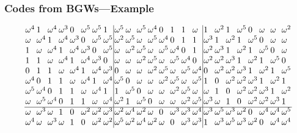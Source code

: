 \documentclass{beamer}
\begin{document}
 \begin{frame}
  \frametitle{Codes from BGWs---Example}
  \begin{scriptsize}
  \[
  \arraycolsep=1.0pt\def\arraystretch{1.0}
   \begin{array}{llllllll|llllllll|llllllll}
\omega^4 & 1 & \omega^4 & \omega^3 & 0 & \omega^5 & \omega^5 & 1 & \omega^5 & \omega & \omega^5 & \omega^4 & 0 & 1 & 1 & \omega & 1 & \omega^2 & 1 & \omega^5 & 0 & \omega & \omega & \omega^2 \\
\omega & \omega^4 & 1 & \omega^4 & \omega^3 & 0 & \omega^5 & \omega^5 & \omega^2 & \omega^5 & \omega & \omega^5 & \omega^4 & 0 & 1 & 1 & \omega^3 & 1 & \omega^2 & 1 & \omega^5 & 0 & \omega & \omega \\
1 & \omega & \omega^4 & 1 & \omega^4 & \omega^3 & 0 & \omega^5 & \omega & \omega^2 & \omega^5 & \omega & \omega^5 & \omega^4 & 0 & 1 & \omega^2 & \omega^3 & 1 & \omega^2 & 1 & \omega^5 & 0 & \omega \\
1 & 1 & \omega & \omega^4 & 1 & \omega^4 & \omega^3 & 0 & \omega & \omega & \omega^2 & \omega^5 & \omega & \omega^5 & \omega^4 & 0 & \omega^2 & \omega^2 & \omega^3 & 1 & \omega^2 & 1 & \omega^5 & 0 \\
0 & 1 & 1 & \omega & \omega^4 & 1 & \omega^4 & \omega^3 & 0 & \omega & \omega & \omega^2 & \omega^5 & \omega & \omega^5 & \omega^4 & 0 & \omega^2 & \omega^2 & \omega^3 & 1 & \omega^2 & 1 & \omega^5 \\
\omega^4 & 0 & 1 & 1 & \omega & \omega^4 & 1 & \omega^4 & \omega^5 & 0 & \omega & \omega & \omega^2 & \omega^5 & \omega & \omega^5 & 1 & 0 & \omega^2 & \omega^2 & \omega^3 & 1 & \omega^2 & 1 \\
\omega^5 & \omega^4 & 0 & 1 & 1 & \omega & \omega^4 & 1 & 1 & \omega^5 & 0 & \omega & \omega & \omega^2 & \omega^5 & \omega & \omega & 1 & 0 & \omega^2 & \omega^2 & \omega^3 & 1 & \omega^2 \\
\omega & \omega^5 & \omega^4 & 0 & 1 & 1 & \omega & \omega^4 & \omega^2 & 1 & \omega^5 & 0 & \omega & \omega & \omega^2 & \omega^5 & \omega^3 & \omega & 1 & 0 & \omega^2 & \omega^2 & \omega^3 & 1 \\ \hline
\omega & \omega^3 & \omega & 1 & 0 & \omega^2 & \omega^2 & \omega^3 & \omega^2 & \omega^4 & \omega^2 & \omega & 0 & \omega^3 & \omega^3 & \omega^4 & \omega^3 & \omega^5 & \omega^3 & \omega^2 & 0 & \omega^4 & \omega^4 & \omega^5 \\
\omega^4 & \omega & \omega^3 & \omega & 1 & 0 & \omega^2 & \omega^2 & \omega^5 & \omega^2 & \omega^4 & \omega^2 & \omega & 0 & \omega^3 & \omega^3 & 1 & \omega^3 & \omega^5 & \omega^3 & \omega^2 & 0 & \omega^4 & \omega^4 \\

\end{array}\]
\end{scriptsize}
\end{frame}
\end{document}
